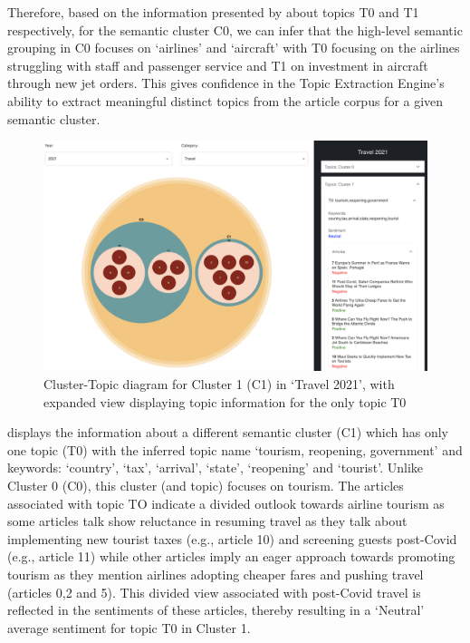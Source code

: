 Therefore, based on the information presented by  about topics T0 and T1 respectively, for the semantic cluster C0, we can infer that the high-level semantic grouping in C0 focuses on `airlines' and `aircraft' with T0 focusing on the airlines struggling with staff and passenger service and T1 on investment in aircraft through new jet orders. This gives confidence in the Topic Extraction Engine's ability to extract meaningful distinct topics from the article corpus for a given semantic cluster. 


\begin{figure}[H]
  \centering
  \includegraphics[width=0.99\linewidth]{images/travel2021_topics_2.png}
  \caption{Cluster-Topic diagram for Cluster 1 (C1) in `Travel 2021', with expanded view displaying topic information for the only topic T0}
  \label{fig:topics2_travel2021}
\end{figure}

 displays the information about a different semantic cluster (C1) which has only one topic (T0) with the inferred topic name `tourism, reopening, government' and keywords: `country', `tax', `arrival', `state', `reopening' and `tourist'. Unlike Cluster 0 (C0), this cluster (and topic) focuses on tourism. The articles associated with topic TO indicate a divided outlook towards airline tourism as some articles talk show reluctance in resuming travel as they talk about implementing new tourist taxes (e.g., article 10) and screening guests post-Covid (e.g., article 11) while other articles imply an eager approach towards promoting tourism as they mention airlines adopting cheaper fares and pushing travel (articles 0,2 and 5). This divided view associated with post-Covid travel is reflected in the sentiments of these articles, thereby resulting in a `Neutral' average sentiment for topic T0 in Cluster 1.


